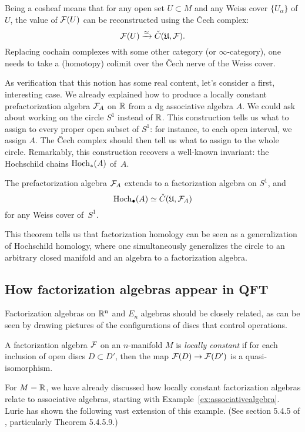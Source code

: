 \documentclass[11pt]{amsart}
\def\owen#1{{\textcolor{violet!50!black}{OG: {#1}}}}
\begin{document}
Being a cosheaf means that for any open set $U \subset M$ and any Weiss cover $\{ U_\alpha\}$ of $U$,
the value of $\mathcal F(U)$ can be reconstructed using the \v{C}ech complex:
\[
\mathcal F(U) \xrightarrow{\simeq} \check{C}(\mathfrak{U},\mathcal F).
\]
Replacing cochain complexes with some other category (or $\infty$-category), one needs to take a (homotopy) colimit over the \v{C}ech nerve of the Weiss cover.

As verification that this notion has some real content, let's consider a first, interesting case.
We already explained how to produce a locally constant prefactorization algebra $\mathcal F_A$ on $\mathbb R$ from a dg associative algebra $A$.
We could ask about working on the circle $S^1$ instead of $\mathbb R$.
This construction tells us what to assign to every proper open subset of $S^1$: for instance, to each open interval, we assign $A$.
The \v{C}ech complex should then tell us what to assign to the whole circle.
Remarkably, this construction recovers a well-known invariant: the Hochschild chains ${\rm Hoch}_*(A)$ of~$A$.

\begin{thm}[\owen{citations}]
The prefactorization algebra $\mathcal F_A$ extends to a factorization algebra on $S^1$, and
\[
{\rm Hoch}_\bullet(A) \simeq \check{C}(\mathfrak{U},\mathcal F_A)
\]
for any Weiss cover of~$S^1$.
\end{thm}

This theorem tells us that factorization homology can be seen as a generalization of Hochschild homology,
where one simultaneously generalizes the circle to an arbitrary closed manifold and an algebra to a factorization algebra.

\subsection{How factorization algebras appear in QFT}

Factorization algebras on $\mathbb R^n$ and $E_n$ algebras should be closely related,
as can be seen by drawing pictures of the configurations of discs that control operations.

\begin{dfn}
A factorization algebra $\mathcal F$ on an $n$-manifold $M$ is \emph{locally constant} if for each inclusion of open discs $D \subset D'$, then the map $\mathcal F(D) \to \mathcal F(D')$ is a quasi-isomorphism.
\end{dfn}

For $M = \mathbb R$, we have already discussed how locally constant factorization algebras relate to associative algebras, starting with Example~\ref{ex:associativealgebra}.
Lurie has shown the following vast extension of this example. (See section 5.4.5 of \cite{LurieHA}, particularly Theorem 5.4.5.9.)
\end{document}
